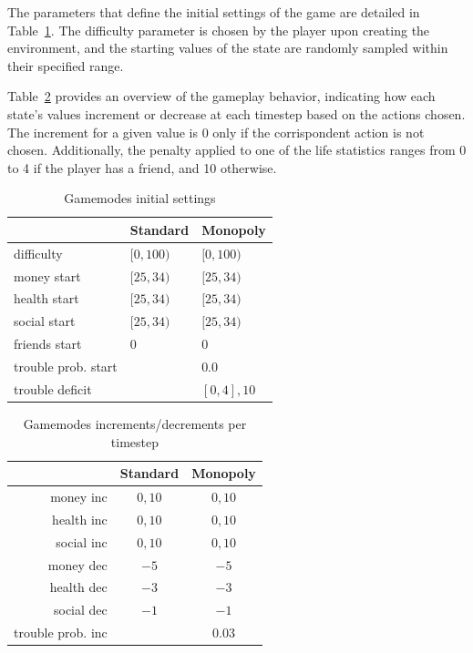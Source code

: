 \documentclass{article}
\begin{document}
The parameters that define the initial settings of the game are detailed in Table~\ref{gm_start}. The difficulty parameter is chosen by the player upon creating the environment, and the starting values of the state are randomly sampled within their specified range. 

Table~\ref{gm_behaviour} provides an overview of the gameplay behavior, indicating how each state's values increment or decrease at each timestep based on the actions chosen. The increment for a given value is \(0\) only if the corrispondent action is not chosen. Additionally, the penalty applied to one of the life statistics ranges from 0 to 4 if the player has a friend, and 10 otherwise.


\begin{table}
  \caption{Gamemodes initial settings}
  \label{gm_start}
  \centering
  \begin{tabular}{lll}
    \toprule
    & Standard     & Monopoly                               \\
    \midrule
    difficulty              & \([0,100)\)   & \([0,100)\)   \\
    money start             & \([25,34)\)   & \([25,34)\)   \\
    health start            & \([25,34)\)   & \([25,34)\)   \\
    social start            & \([25,34)\)   & \([25,34)\)   \\
    friends start           & \(0\)         & \(0\)         \\
    trouble prob. start     &               & \(0.0\)       \\
    trouble deficit         &               & \([0,4],10\)      \\
    \bottomrule
  \end{tabular}
\end{table}

\begin{table}
  \caption{Gamemodes increments/decrements per timestep}
  \label{gm_behaviour}
  \centering
  \begin{tabular}{rcc}
    \toprule
    & Standard     & Monopoly                           \\
    \midrule
    money inc           & \(0,10\)      & \(0,10\)      \\
    health inc          & \(0,10\)      & \(0,10\)      \\
    social inc          & \(0,10\)      & \(0,10\)      \\
    money dec           & \(-5\)        & \(-5\)        \\
    health dec          & \(-3\)        & \(-3\)        \\
    social dec          & \(-1\)        & \(-1\)        \\
    trouble prob. inc   &               & \(0.03\)      \\
    \bottomrule
  \end{tabular}
\end{table}
\end{document}
